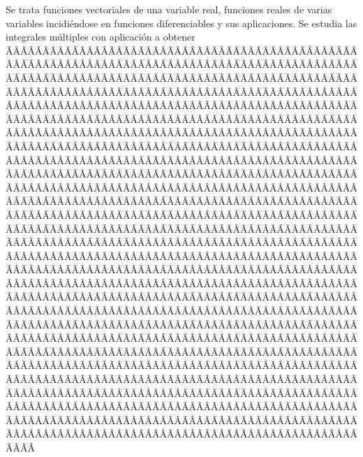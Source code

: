 \begin{sumilla}


\begin{fundamentacion}
Se trata funciones vectoriales de una variable real, funciones reales de varias variables incidi\'endose en funciones diferenciables y sus aplicaciones. Se estudia las integrales m\'ultiples con aplicaci\'on a obtener ÃÂÃÂÃÂÃÂÃÂÃÂÃÂÃÂÃÂÃÂÃÂÃÂÃÂÃÂÃÂÃÂÃÂÃÂÃÂÃÂÃÂÃÂÃÂÃÂÃÂÃÂÃÂÃÂÃÂÃÂÃÂÃÂÃÂÃÂÃÂÃÂÃÂÃÂÃÂÃÂÃÂÃÂÃÂÃÂÃÂÃÂÃÂÃÂÃÂÃÂÃÂÃÂÃÂÃÂÃÂÃÂÃÂÃÂÃÂÃÂÃÂÃÂÃÂÃÂÃÂÃÂÃÂÃÂÃÂÃÂÃÂÃÂÃÂÃÂÃÂÃÂÃÂÃÂÃÂÃÂÃÂÃÂÃÂÃÂÃÂÃÂÃÂÃÂÃÂÃÂÃÂÃÂÃÂÃÂÃÂÃÂÃÂÃÂÃÂÃÂÃÂÃÂÃÂÃÂÃÂÃÂÃÂÃÂÃÂÃÂÃÂÃÂÃÂÃÂÃÂÃÂÃÂÃÂÃÂÃÂÃÂÃÂÃÂÃÂÃÂÃÂÃÂÃÂÃÂÃÂÃÂÃÂÃÂÃÂÃÂÃÂÃÂÃÂÃÂÃÂÃÂÃÂÃÂÃÂÃÂÃÂÃÂÃÂÃÂÃÂÃÂÃÂÃÂÃÂÃÂÃÂÃÂÃÂÃÂÃÂÃÂÃÂÃÂÃÂÃÂÃÂÃÂÃÂÃÂÃÂÃÂÃÂÃÂÃÂÃÂÃÂÃÂÃÂÃÂÃÂÃÂÃÂÃÂÃÂÃÂÃÂÃÂÃÂÃÂÃÂÃÂÃÂÃÂÃÂÃÂÃÂÃÂÃÂÃÂÃÂÃÂÃÂÃÂÃÂÃÂÃÂÃÂÃÂÃÂÃÂÃÂÃÂÃÂÃÂÃÂÃÂÃÂÃÂÃÂÃÂÃÂÃÂÃÂÃÂÃÂÃÂÃÂÃÂÃÂÃÂÃÂÃÂÃÂÃÂÃÂÃÂÃÂÃÂÃÂÃÂÃÂÃÂÃÂÃÂÃÂÃÂÃÂÃÂÃÂÃÂÃÂÃÂÃÂÃÂÃÂÃÂÃÂÃÂÃÂÃÂÃÂÃÂÃÂÃÂÃÂÃÂÃÂÃÂÃÂÃÂÃÂÃÂÃÂÃÂÃÂÃÂÃÂÃÂÃÂÃÂÃÂÃÂÃÂÃÂÃÂÃÂÃÂÃÂÃÂÃÂÃÂÃÂÃÂÃÂÃÂÃÂÃÂÃÂÃÂÃÂÃÂÃÂÃÂÃÂÃÂÃÂÃÂÃÂÃÂÃÂÃÂÃÂÃÂÃÂÃÂÃÂÃÂÃÂÃÂÃÂÃÂÃÂÃÂÃÂÃÂÃÂÃÂÃÂÃÂÃÂÃÂÃÂÃÂÃÂÃÂÃÂÃÂÃÂÃÂÃÂÃÂÃÂÃÂÃÂÃÂÃÂÃÂÃÂÃÂÃÂÃÂÃÂÃÂÃÂÃÂÃÂÃÂÃÂÃÂÃÂÃÂÃÂÃÂÃÂÃÂÃÂÃÂÃÂÃÂÃÂÃÂÃÂÃÂÃÂÃÂÃÂÃÂÃÂÃÂÃÂÃÂÃÂÃÂÃÂÃÂÃÂÃÂÃÂÃÂÃÂÃÂÃÂÃÂÃÂÃÂÃÂÃÂÃÂÃÂÃÂÃÂÃÂÃÂÃÂÃÂÃÂÃÂÃÂÃÂÃÂÃÂÃÂÃÂÃÂÃÂÃÂÃÂÃÂÃÂÃÂÃÂÃÂÃÂÃÂÃÂÃÂÃÂÃÂÃÂÃÂÃÂÃÂÃÂÃÂÃÂÃÂÃÂÃÂÃÂÃÂÃÂÃÂÃÂÃÂÃÂÃÂÃÂÃÂÃÂÃÂÃÂÃÂÃÂÃÂÃÂÃÂÃÂÃÂÃÂÃÂÃÂÃÂÃÂÃÂÃÂÃÂÃÂÃÂÃÂÃÂÃÂÃÂÃÂÃÂÃÂÃÂÃÂÃÂÃÂÃÂÃÂÃÂÃÂÃÂÃÂÃÂÃÂÃÂÃÂÃÂÃÂÃÂÃÂÃÂÃÂÃÂÃÂÃÂÃÂÃÂÃÂÃÂÃÂÃÂÃÂÃÂÃÂÃÂÃÂÃÂÃÂÃÂÃÂÃÂÃÂÃÂÃÂÃÂÃÂÃÂÃÂÃÂÃÂÃÂÃÂÃÂÃÂÃÂÃÂÃÂÃÂÃÂÃÂÃÂÃÂÃÂÃÂÃÂÃÂÃÂÃÂÃÂÃÂÃÂÃÂÃÂÃÂÃÂÃÂÃÂÃÂÃÂÃÂÃÂÃÂÃÂÃÂÃÂÃÂÃÂÃÂÃÂÃÂÃÂÃÂÃÂÃÂÃÂÃÂÃÂÃÂÃÂÃÂÃÂÃÂÃÂÃÂÃÂÃÂÃÂÃÂÃÂÃÂÃÂÃÂÃÂÃÂÃÂÃÂÃÂÃÂÃÂÃÂÃÂÃÂÃÂÃÂÃÂÃÂÃÂÃÂÃÂÃÂÃÂÃÂÃÂÃÂÃÂÃÂÃÂÃÂÃÂÃÂÃÂÃÂÃÂÃÂÃÂÃÂÃÂÃÂÃÂÃÂÃÂÃÂÃÂÃÂÃÂÃÂÃÂÃÂÃÂÃÂÃÂÃÂÃÂÃÂÃÂÃÂÃÂÃÂÃÂÃÂÃÂÃÂÃÂÃÂÃÂÃÂÃÂÃÂÃÂÃÂÃÂÃÂÃÂÃÂÃÂÃÂÃÂÃÂÃÂÃÂÃÂÃÂÃÂÃÂÃÂÃÂÃÂÃÂÃÂÃÂÃÂÃÂÃÂÃÂÃÂÃÂÃÂÃÂÃÂÃÂÃÂÃÂÃÂÃÂÃÂÃÂÃÂÃÂÃÂÃÂÃÂÃÂÃÂÃÂÃÂ
\end{fundamentacion}
\end{sumilla}
